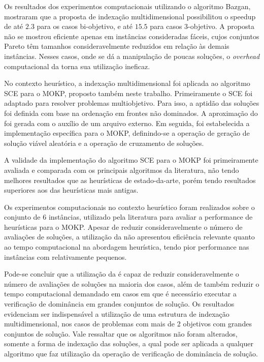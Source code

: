 Os resultados dos experimentos computacionais utilizando o algoritmo Bazgan,
mostraram que a proposta de indexação multidimensional possibilitou o speedup
de até $2.3$ para os casos bi-objetivo, e até $15.5$ para casos 3-objetivo.
A proposta não se mostrou eficiente apenas em instâncias consideradas fáceis,
cujos conjuntos Pareto têm tamanhos consideravelmente reduzidos em relação
às demais instâncias.
Nesses casos, onde se dá a manipulação de poucas soluções,
o \emph{overhead} computacional da \kdtree{} torna sua utilização ineficaz.

No contexto heurístico, a indexação multidimensional
foi aplicada ao algoritmo SCE para o MOKP, proposto também neste trabalho.
Primeiramente o SCE foi adaptado para resolver problemas multiobjetivo.
Para isso, a aptidão das soluções foi definida com base na ordenação
em frontes não dominados.
A aproximação do \paretoset{} foi gerada com o auxílio de um arquivo externo.
Em seguida, foi estabelecida a implementação específica para o MOKP,
definindo-se a operação de geração de solução viável
aleatória e a operação de cruzamento de soluções.

A validade da implementação do algoritmo SCE para o MOKP foi primeiramente
avaliada e comparada com os principais algoritmos da literatura,
não tendo melhores resultados que as
heurísticas de estado-da-arte, porém tendo resultados superiores aos
das heurísticas mais antigas.

Os experimentos computacionais no contexto heurístico
foram realizados sobre o conjunto de 6 instâncias,
utilizado pela literatura para avaliar a performance de heurísticas para o MOKP.
Apesar de reduzir consideravelmente o número de avaliações de soluções,
a utilização da \kdtree{} não apresentou eficiência relevante quanto ao tempo computacional
na abordagem heurística, tendo pior performance nas instâncias com \paretoset{}
relativamente pequenos.

Pode-se concluir que a utilização da \kdtree{} é capaz de reduzir consideravelmente
o número de avaliações de soluções na maioria dos casos, além de também reduzir o tempo computacional
demandado em casos em que é necessário executar a verificação de dominância em grandes
conjuntos de solução.
Os resultados evidenciam ser indispensável
a utilização de uma estrutura de indexação multidimensional,
nos casos de problemas com mais de 2 objetivos com grandes
conjuntos de solução.
Vale ressaltar que os algoritmos não foram alterados, somente
a forma de indexação das soluções, a qual pode ser aplicada a qualquer algoritmo
que faz utilização da operação de verificação de dominância de solução.


